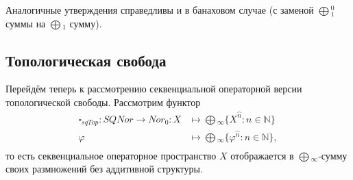 \documentclass[12pt]{article}
\begin{document}
Аналогичные утверждения справедливы и в банаховом случае (с заменой $\bigoplus{}_1^0$ суммы на $\bigoplus{}_1$ сумму).








































\subsection{Топологическая свобода}

Перейдём теперь к рассмотрению секвенциальной операторной версии  топологической свободы. Рассмотрим функтор 
$$
\begin{aligned}
\square_{sqTop} : SQNor \to Nor_0: X &\mapsto \bigoplus{}_\infty \{X^{\wideparen{n}} : n \in \mathbb{N}\}\\
\varphi&\mapsto\bigoplus{}_\infty\{\varphi^{\wideparen{n}}:n\in\mathbb{N}\},\\
\end{aligned}
$$ 
то есть секвенциальное операторное пространство $X$ отображается в $\bigoplus{}_\infty$-сумму своих размножений без аддитивной структуры.
\end{document}
